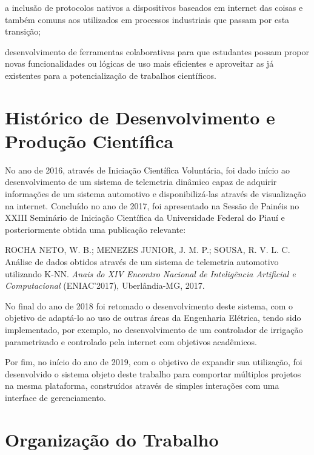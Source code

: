 \begin{alineascomponto}
	\item a inclusão de protocolos nativos a dispositivos baseados em internet das coisas e também comuns aos utilizados em processos industriais que passam por esta transição;
    \item desenvolvimento de ferramentas colaborativas para que estudantes possam propor novas funcionalidades ou lógicas de uso mais eficientes e aproveitar as já existentes para a potencialização de trabalhos científicos.
\end{alineascomponto}

\section{Histórico de Desenvolvimento e Produção Científica}
\label{sec:historico-producao}

No ano de 2016, através de Iniciação Científica Voluntária, foi dado início ao desenvolvimento de um sistema de telemetria dinâmico capaz de adquirir informações de um sistema automotivo e disponibilizá-las através de visualização na internet. Concluído no ano de 2017, foi apresentado na Sessão de Painéis no XXIII Seminário de Iniciação Científica da Universidade Federal do Piauí e posteriormente obtida uma publicação relevante:

\begin{alineascomponto}
\item ROCHA NETO, W. B.; MENEZES JUNIOR, J. M. P.; SOUSA, R. V. L. C.
Análise de dados obtidos através de um sistema de telemetria automotivo utilizando K-NN.\textit{ Anais do XIV Encontro Nacional de Inteligência Artificial e
Computacional} (ENIAC’2017), Uberlândia-MG, 2017.
\end{alineascomponto}

No final do ano de 2018 foi retomado o desenvolvimento deste sistema, com o objetivo de adaptá-lo ao uso de outras áreas da Engenharia Elétrica, tendo sido implementado, por exemplo, no desenvolvimento de um controlador de irrigação parametrizado e controlado pela internet com objetivos acadêmicos.

Por fim, no início do ano de 2019, com o objetivo de expandir sua utilização, foi desenvolvido o sistema objeto deste trabalho para comportar múltiplos projetos na mesma plataforma, construídos através de simples interações com uma interface de gerenciamento.


\section{Organização do Trabalho}
\label{sec:organizacao-trabalho}

